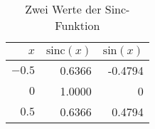 \begin{table}[h!]%
	\begin{center}
	
		\begin{tabular}{|r|r|r|}
			\firsthline
			$x$&$\mathrm{sinc}(x)$&$\mathrm{sin}(x)$\\\hline\hline
			$-0.5$&0.6366&-0.4794\\\hline
			$0$&1.0000&0\\\hline
			$0.5$&0.6366&0.4794\\\hline
		\end{tabular}
		\caption{Zwei Werte der Sinc-Funktion}
		\label{Table_Sinc}
	\end{center}
\end{table}








